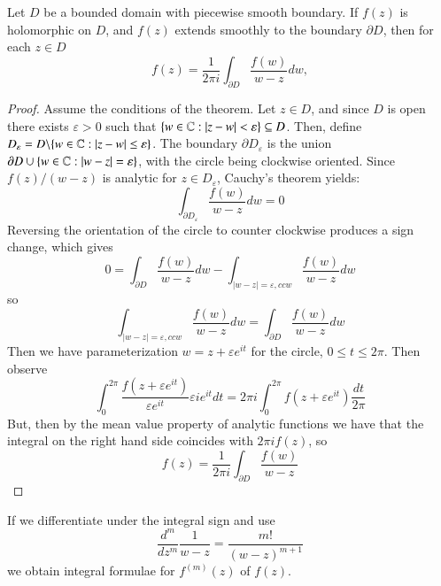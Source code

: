 \documentclass[12pt, a4paper, oneside, openright, titlepage]{book}
\begin{document}
\begin{namthm}
    Let $D$ be a bounded domain with piecewise smooth boundary. If $f(z)$ is holomorphic on $D$, and $f(z)$ extends smoothly to the boundary $\partial D$, then for each $z \in D$ \begin{equation*}
        f(z) = \frac{1}{2\pi i}\int_{\partial D}\frac{f(w)}{w-z}dw,
    \end{equation*}
\end{namthm}
\begin{proof}
    Assume the conditions of the theorem. Let $z \in D$, and since $D$ is open there exists $\varepsilon > 0$ such that $\{w \in \mathbb C: |z-w| < \varepsilon\} \subseteq D$. Then, define $D_{\varepsilon} = D\backslash \{w \in \mathbb C:|z-w| \leq \varepsilon\}$. The boundary $\partial D_{\varepsilon}$ is the union $\partial D\cup\{w \in \mathbb C:|w-z|=\varepsilon\}$, with the circle being clockwise oriented. Since $f(z)/(w-z)$ is analytic for $z \in D_{\varepsilon}$, Cauchy's theorem yields: \begin{equation*}
        \int_{\partial D_{\varepsilon}}\frac{f(w)}{w-z}dw = 0
    \end{equation*}
    Reversing the orientation of the circle to counter clockwise produces a sign change, which gives \begin{equation*}
        0 = \int_{\partial D}\frac{f(w)}{w-z}dw - \int_{|w-z| = \varepsilon, ccw}\frac{f(w)}{w-z}dw
    \end{equation*}
    so \begin{equation*}
        \int_{|w-z|=\varepsilon,ccw} \frac{f(w)}{w-z}dw = \int_{\partial D}\frac{f(w)}{w-z}dw
    \end{equation*}
    Then we have parameterization $w = z+\varepsilon e^{it}$ for the circle, $0 \leq t \leq 2\pi$. Then observe \begin{equation*}
        \int_{0}^{2\pi}\frac{f(z+\varepsilon e^{it})}{\varepsilon e^{it}}\varepsilon ie^{it}dt = 2\pi i\int_0^{2\pi}f(z+\varepsilon e^{it})\frac{dt}{2\pi}
    \end{equation*}
    But, then by the mean value property of analytic functions we have that the integral on the right hand side coincides with $2\pi if(z)$, so \begin{equation*}
        f(z) = \frac{1}{2\pi i}\int_{\partial D}\frac{f(w)}{w-z}
    \end{equation*}
\end{proof}

If we differentiate under the integral sign and use \begin{equation*}
    \frac{d^m}{dz^m}\frac{1}{w-z} = \frac{m!}{(w-z)^{m+1}}
\end{equation*}
we obtain integral formulae for $f^{(m)}(z)$ of $f(z)$.
\end{document}
